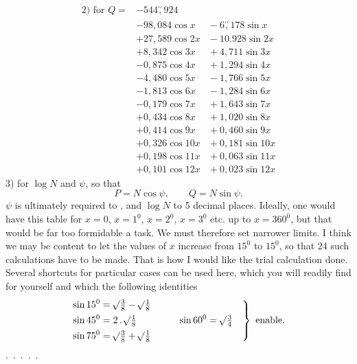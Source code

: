 \[
\begin{aligned}
\text{2) for }Q={}&-544\overset{\prime\prime}{,}924\\
&-98{,}084\cos x &{}-6\overset{\prime\prime}{,}178\sin x\\
&+27{,}589\cos2x &{}-10.928\sin2x\\
&+8{,}342\cos3x &{}+4{,}711\sin3x\\
&-0{,}875\cos4x &{}+1{,}294\sin4x\\
&-4{,}480\cos5x &{}-1{,}766\sin5x\\
&-1{,}813\cos6x &{}-1{,}284\sin6x\\
&-0{,}179\cos7x &{}+1{,}643\sin7x\\
&+0{,}434\cos8x &{}+1{,}020\sin8x\\
&+0{,}414\cos9x &{}+0{,}460\sin9x\\
&+0{,}326\cos10x &{}+0{,}181\sin10x\\
&+0{,}198\cos11x &{}+0{,}063\sin11x\\
&+0{,}101\cos12x &{}+0{,}023\sin12x
\end{aligned}
\]
\noindent\hspace*{\parindent}3) for \(\log N\) and \(\psi\), so that
\[
P=N\cos\psi,\qquad Q=N\sin\psi.
\]
\noindent\(\psi\) is ultimately required to , and \(\log N\) to 5 decimal places. Ideally,
one would have this table for \(x=0\), \(x=1^0\), \(x=2^0\), \(x=3^0\) etc. up to
\(x=360^0\), but that would be far too formidable a task. We
must therefore set narrower limits. I think we may  be content
to let the values of \(x\) increase from \(15^0\) to \(15^0\), so that
24 such calculations have to be made. That is how I would like the trial calculation done.
Several shortcuts for particular cases can be used here,
which you will readily find for yourself and which the following identities
\[
\left.\begin{aligned}
\sin15^0&=\mathord{{}^{}\!\surd}\tfrac{3}{8}-\mathord{{}^{}\!\surd}\tfrac{1}{8}\\
\sin45^0&=2\,\mathord{.}\,\mathord{{}^{}\!\surd}\tfrac{1}{8}
&\qquad\sin60^0&=\mathord{{}^{}\!\surd}\tfrac{3}{4}\\
\sin75^0&=\mathord{{}^{}\!\surd}\tfrac{3}{8}+\mathord{{}^{}\!\surd}\tfrac{1}{8}
\end{aligned}\right\}\ \text{enable.}
\]
\noindent\hspace*{\parindent}.\ .\ .\ .\ .
\clearpage
\endgroup
